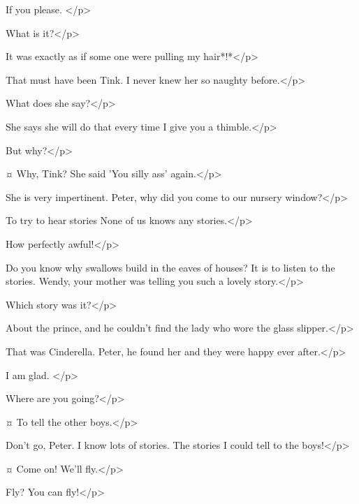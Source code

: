 \begin{drama}
\wendyspeaks
If you please.
</p>

\peterspeaks
What is it?</p>

\wendyspeaks
It was exactly as if some one were pulling my hair*!*</p>

\peterspeaks
That must have been Tink.
I never knew her so naughty before.</p>


\wendyspeaks
What does she say?</p>

\peterspeaks
She says she will do that every time I give you a thimble.</p>

\wendyspeaks
But why?</p>

\peterspeaks {}¤
Why, Tink?
She said 'You silly ass' again.</p>

\wendyspeaks
She is very impertinent.
Peter, why did you come to our nursery window?</p>

\peterspeaks
To try to hear stories None of us knows any stories.</p>

\wendyspeaks
How perfectly awful!</p>

\peterspeaks
Do you know why swallows build in the eaves of houses?
It is to listen to the stories.
Wendy, your mother was telling you such a lovely story.</p>

\wendyspeaks
Which story was it?</p>

\peterspeaks
About the prince, and he couldn't find the lady who wore the glass slipper.</p>

\wendyspeaks
That was Cinderella.
Peter, he found her and they were happy ever after.</p>

\peterspeaks
I am glad.
</p>

\wendyspeaks
Where are you going?</p>

\peterspeaks {}¤
To tell the other boys.</p>

\wendyspeaks
Don't go, Peter.
I know lots of stories.
The stories I could tell to the boys!</p>

\peterspeaks {}¤
Come on!
We'll fly.</p>

\wendyspeaks
Fly?
You can fly!</p>



\end{drama}
